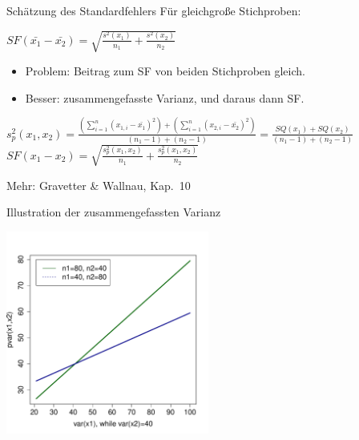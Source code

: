 \begin{frame}
  {Schätzung des Standardfehlers}
  Für \alert{gleichgroße Stichproben}:
  \begin{center}
    \alert{$SF(\bar{x_1}-\bar{x_2})=\sqrt{\frac{s^2(x_1)}{n_1}+\frac{s^2(x_2)}{n_2}}$}
  \end{center}
  \pause
  \begin{itemize}[<+->]
    \item Problem: Beitrag zum SF von beiden Stichproben gleich.
    \item Besser: \alert{zusammengefasste Varianz}, und daraus dann SF.
  \end{itemize}
  \pause
  \begin{center}
    \alert{$s^2_p(x_1,x_2)=\frac{(\sum\limits_{i=1}^{n}(x_{1,i}-\bar{x_1})^2)+(\sum\limits_{i=1}^{n}(x_{2,i}-\bar{x_2})^2)}{(n_1-1)+(n_2-1)}=\frac{SQ(x_1)+SQ(x_2)}{(n_1-1)+(n_2-1)}$}\\
    \vspace{0.5cm}
    \pause
    \alert{$SF(x_1-x_2)=\sqrt{\frac{s^2_p(x_1,x_2)}{n_1}+\frac{s^2_p(x_1,x_2)}{n_2}}$}
  \end{center}
  \pause
  \footnotesize
  Mehr: Gravetter \& Wallnau, Kap.\ 10
\end{frame}

\begin{frame}
  {Illustration der zusammengefassten Varianz}
  \begin{center}
    \includegraphics[width=0.5\textwidth]{graphics/pvar}
  \end{center}
\end{frame}


